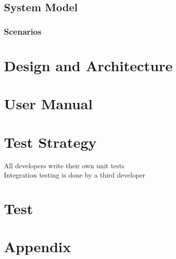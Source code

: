 \documentclass{report}
\begin{document}
\section{System Model}

\subsection{Scenarios}

\chapter{Design and Architecture}

\chapter{User Manual}

\chapter{Test Strategy}
All developers write their own unit tests \\
Integration testing is done by a third developer

\chapter{Test}

\chapter{Appendix}
\end{document}
